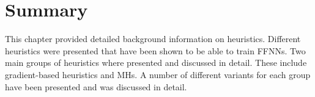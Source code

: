 \section{Summary}
\label{sec:heuristics:summary}

This chapter provided detailed background information on heuristics. Different heuristics were presented that have been shown to be able to train \acp{FFNN}. Two main groups of heuristics where presented and discussed in detail. These include gradient-based heuristics and \acfp{MH}. A number of different variants for each group have been presented and was discussed in detail.
